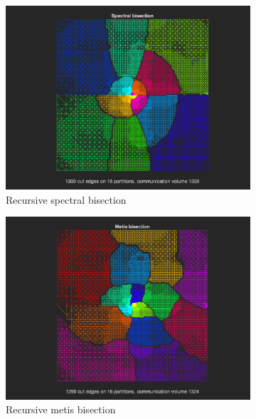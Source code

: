 \documentclass[unicode,11pt,a4paper,oneside,numbers=endperiod,openany]{scrartcl}
\begin{document}
\begin{figure}[h!]
	\centering
	\begin{subfigure}[b]{0.45\textwidth}
	\includegraphics[width=\textwidth]{images/spectral_crack.png}
	\caption{Recursive spectral bisection}
	\end{subfigure}
	\hfill
	\begin{subfigure}[b]{0.455\textwidth}
	\includegraphics[width=\textwidth]{images/metis_crack.png}
	\caption{Recursive metis bisection}
	\end{subfigure}
	\vfill
	\begin{subfigure}[b]{0.45\textwidth}

\end{subfigure}
\end{figure}
\end{document}
